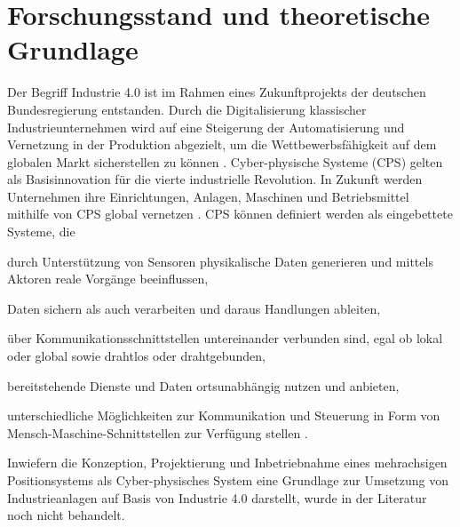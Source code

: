 \documentclass[12pt, a4paper, twoside]{article} %
\begin{document}
\section{Forschungsstand und theoretische Grundlage}
Der Begriff Industrie 4.0 ist im Rahmen eines Zukunftprojekts der deutschen Bundesregierung entstanden. Durch die Digitalisierung klassischer Industrieunternehmen wird auf eine Steigerung der Automatisierung und Vernetzung in der Produktion abgezielt, um die Wettbewerbsfähigkeit auf dem globalen Markt sicherstellen zu können \cite[S. 63]{Winkelhake2021}. Cyber-physische Systeme (CPS) gelten als Basisinnovation für die vierte industrielle Revolution. In Zukunft werden Unternehmen ihre Einrichtungen, Anlagen, Maschinen und Betriebsmittel mithilfe von CPS global vernetzen \cite[S. 5]{Wissenschaft2013}. CPS können definiert werden als eingebettete Systeme, die
\begin{compactitem}
	\item durch Unterstützung von Sensoren physikalische Daten generieren und mittels Aktoren reale Vorgänge beeinflussen,
	\item Daten sichern als auch verarbeiten und daraus Handlungen ableiten,
	\item über Kommunikationsschnittstellen untereinander verbunden sind, egal ob lokal oder global sowie drahtlos oder drahtgebunden,
	\item bereitstehende Dienste und Daten ortsunabhängig nutzen und anbieten,
	\item unterschiedliche Möglichkeiten zur Kommunikation und Steuerung in Form von
Mensch-Maschine-Schnittstellen zur Verfügung stellen \cite[S. 22]{Geisberger2012}.
\end{compactitem}
Inwiefern die Konzeption, Projektierung und Inbetriebnahme eines mehrachsigen Positionsystems als Cyber-physisches System eine Grundlage zur Umsetzung von Industrieanlagen auf Basis von Industrie 4.0 darstellt, wurde in der Literatur noch nicht behandelt.
\end{document}
